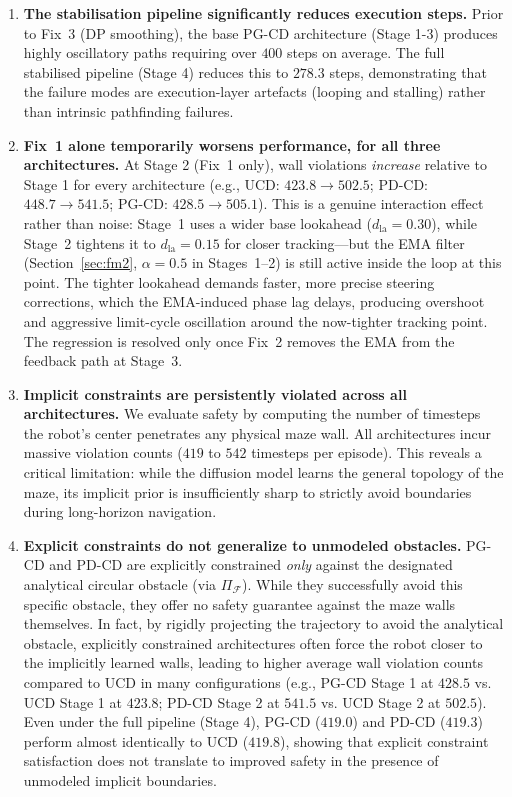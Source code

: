 \documentclass[12pt, a4paper, oneside]{report}
\theoremstyle{definition}
\newcommand{\dlookahead}{d_{\mathrm{la}}}
\begin{document}
\begin{enumerate}[itemsep=5pt]

\item \textbf{The stabilisation pipeline significantly reduces execution steps.} Prior to Fix~3 (DP smoothing), the base PG-CD architecture (Stage 1-3) produces highly oscillatory paths requiring over $400$ steps on average. The full stabilised pipeline (Stage 4) reduces this to $278.3$ steps, demonstrating that the failure modes are execution-layer artefacts (looping and stalling) rather than intrinsic pathfinding failures.

\item \textbf{Fix~1 alone temporarily worsens performance, for all three architectures.} At Stage 2 (Fix~1 only), wall violations \emph{increase} relative to Stage 1 for every architecture (e.g., UCD: $423.8\to502.5$; PD-CD: $448.7\to541.5$; PG-CD: $428.5\to505.1$). This is a genuine interaction effect rather than noise: Stage~1 uses a wider base lookahead ($\dlookahead=0.30$), while Stage~2 tightens it to $\dlookahead=0.15$ for closer tracking---but the EMA filter (Section~\ref{sec:fm2}, $\alpha=0.5$ in Stages~1--2) is still active inside the loop at this point. The tighter lookahead demands faster, more precise steering corrections, which the EMA-induced phase lag delays, producing overshoot and aggressive limit-cycle oscillation around the now-tighter tracking point. The regression is resolved only once Fix~2 removes the EMA from the feedback path at Stage~3.

\item \textbf{Implicit constraints are persistently violated across all architectures.} We evaluate safety by computing the number of timesteps the robot's center penetrates any physical maze wall. All architectures incur massive violation counts ($419$ to $542$ timesteps per episode). This reveals a critical limitation: while the diffusion model learns the general topology of the maze, its implicit prior is insufficiently sharp to strictly avoid boundaries during long-horizon navigation.

\item \textbf{Explicit constraints do not generalize to unmodeled obstacles.} PG-CD and PD-CD are explicitly constrained \textit{only} against the designated analytical circular obstacle (via $\Pi_{\mathcal{F}}$). While they successfully avoid this specific obstacle, they offer no safety guarantee against the maze walls themselves. In fact, by rigidly projecting the trajectory to avoid the analytical obstacle, explicitly constrained architectures often force the robot closer to the implicitly learned walls, leading to higher average wall violation counts compared to UCD in many configurations (e.g., PG-CD Stage 1 at $428.5$ vs. UCD Stage 1 at $423.8$; PD-CD Stage 2 at $541.5$ vs. UCD Stage 2 at $502.5$). Even under the full pipeline (Stage 4), PG-CD ($419.0$) and PD-CD ($419.3$) perform almost identically to UCD ($419.8$), showing that explicit constraint satisfaction does not translate to improved safety in the presence of unmodeled implicit boundaries.


\end{enumerate}
\end{document}
